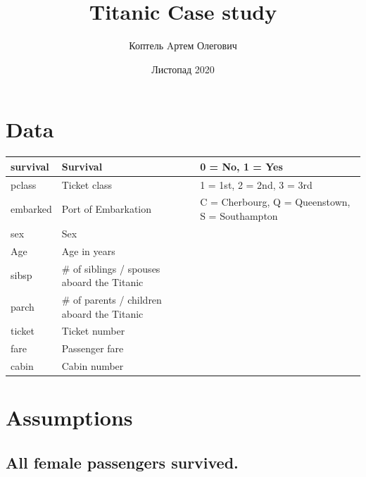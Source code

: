 \documentclass[11pt]{article}
\title{Titanic Case study}
\author{Коптель Aртем Олегович}
\date{Листопад 2020}
\begin{document}
    \section{Data}\label{sec:data}
    \begin{center}
        \begin{tabular}{ |p{3cm}|p{4cm}|p{4cm}| }
            \hline
            survival & Survival                                    & 0 = No, 1 = Yes                                \\
            \hline
            pclass   & Ticket class                                & 1 = 1st, 2 = 2nd, 3 = 3rd                      \\
            \hline
            embarked & Port of Embarkation                         & C = Cherbourg, Q = Queenstown, S = Southampton \\
            \hline
            sex      & Sex                                         &                                                \\
            \hline
            Age      & Age in years                                &                                                \\
            \hline
            sibsp    & \# of siblings / spouses aboard the Titanic &                                                \\
            \hline
            parch    & \# of parents / children aboard the Titanic &                                                \\
            \hline
            ticket   & Ticket number                               &                                                \\
            \hline
            fare     & Passenger fare                              &                                                \\
            \hline
            cabin    & Cabin number                                &                                                \\
            \hline
        \end{tabular}
    \end{center}


    \section{Assumptions}\label{sec:assumptions}

    \subsection{All female passengers survived.}\label{subsec:first_assumption}
\end{document}
